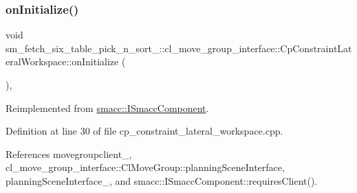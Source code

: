 \subsubsection{\texorpdfstring{on\+Initialize()}{onInitialize()}}
{\footnotesize\ttfamily void sm\+\_\+fetch\+\_\+six\+\_\+table\+\_\+pick\+\_\+n\+\_\+sort\+\_\+::cl\+\_\+move\+\_\+group\+\_\+interface\+::\+Cp\+Constraint\+Lateral\+Workspace\+::on\+Initialize (\begin{DoxyParamCaption}{ }\end{DoxyParamCaption})\hspace{0.3cm}{\ttfamily [override]}, {\ttfamily [virtual]}}



Reimplemented from \hyperlink{classsmacc_1_1ISmaccComponent_ae6f71d008db12553912e9436184b9e65}{smacc\+::\+I\+Smacc\+Component}.



Definition at line 30 of file cp\+\_\+constraint\+\_\+lateral\+\_\+workspace.\+cpp.



References movegroupclient\+\_\+, cl\+\_\+move\+\_\+group\+\_\+interface\+::\+Cl\+Move\+Group\+::planning\+Scene\+Interface, planning\+Scene\+Interface\+\_\+, and smacc\+::\+I\+Smacc\+Component\+::requires\+Client().


